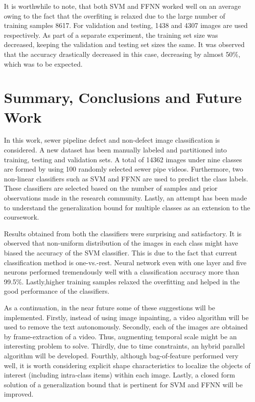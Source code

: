 \documentclass[letterpaper,12pt, onecolumn]{article}%
\begin{document}
It is worthwhile to note, that both SVM and FFNN worked well on an average owing to the fact that the overfiting is relaxed due to the large number of training samples 8617. For validation and testing, 1438 and 4307 images are used respectively. As part of a separate experiment, the training set size was decreased, keeping the validation and testing set sizes the same. It was observed that the accuracy drastically decreased in this case, decreasing by almost 50\%, which was to be expected.


\section{Summary, Conclusions and Future Work} \label{sec:summary_conclusion}
\noindent
In this work, sewer pipeline defect and non-defect image classification is considered. A new dataset has been manually labeled and partitioned into training, testing and validation sets. A total of 14362 images under nine classes are formed by using 100 randomly selected sewer pipe videos. Furthermore, two non-linear classifiers such as SVM and FFNN are used to predict the class labels. These classifiers are selected based on the number of samples and prior observations made in the research community. Lastly, an attempt has been made to understand the generalization bound for multiple classes as an extension to the coursework.    

Results obtained from both the classifiers were surprising and satisfactory. It is observed that non-uniform distribution of the images in each class might have biased the accuracy of the SVM classifier. This is due to the fact that current classification method is one-vs.-rest. Neural network even with one layer and five neurons performed tremendously well with a classification accuracy more than 99.5\%. Lastly,higher training samples relaxed the overfitting and helped in the good performance of the classifiers.  

As a continuation, in the near future some of these suggestions will be implemented. Firstly, instead of using image inpainting, a video algorithm will be used to remove the text autonomously. Secondly, each of the  images are obtained by frame-extraction of a video. Thus, augmenting temporal scale might be an interesting problem to solve. Thirdly, due to time constraints, an hybrid parallel algorithm will be developed. Fourthly, although bag-of-feature performed very well, it is worth considering explicit shape characteristics to localize the objects of interest (including intra-class items) within each image. Lastly, a closed form solution of a generalization bound that is pertinent for SVM and FFNN will be improved.
\end{document}
